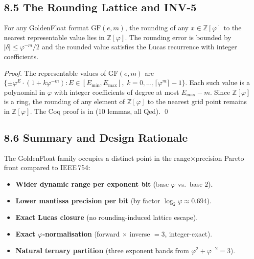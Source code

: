 \subsection{8.5 The Rounding Lattice and INV-5}\label{fa_04:gf-inv5}

\begin{theorem}
\label{fa_04:thm:inv5}
For any GoldenFloat format \(\mathrm{GF}(e,m)\), the rounding of any
\(x \in \mathbb{Z}[\varphi]\) to the nearest representable value lies in
\(\mathbb{Z}[\varphi]\). The rounding error is bounded by
\(|\delta| \le \varphi^{-m}/2\) and the rounded value satisfies the
Lucas recurrence with integer coefficients.
\end{theorem}

\begin{proof}
The representable values of \(\mathrm{GF}(e,m)\) are
\(\{ \pm \varphi^{E} \cdot (1 + k\varphi^{-m}) : E \in [E_{\min}, E_{\max}],
\; k = 0, \ldots, \lceil\varphi^m\rceil - 1 \}\).
Each such value is a polynomial in \(\varphi\) with integer coefficients
of degree at most \(E_{\max} - m\). Since \(\mathbb{Z}[\varphi]\) is a
ring, the rounding of any element of \(\mathbb{Z}[\varphi]\) to the
nearest grid point remains in \(\mathbb{Z}[\varphi]\).
The Coq proof is in
(10 lemmas, all Qed).
\qed
\end{proof}

\subsection{8.6 Summary and Design Rationale}\label{fa_04:gf-summary}

The GoldenFloat family occupies a distinct point in the
range\(\times\)precision Pareto front compared to IEEE\,754:

\begin{itemize}
  \item \textbf{Wider dynamic range per exponent bit} (base \(\varphi\) vs.\
        base \(2\)).
  \item \textbf{Lower mantissa precision per bit} (by factor
        \(\log_2\varphi \approx 0.694\)).
  \item \textbf{Exact Lucas closure} (no rounding-induced lattice escape).
  \item \textbf{Exact \(\varphi\)-normalisation} (forward \(\times\) inverse
        \(= 3\), integer-exact).
  \item \textbf{Natural ternary partition} (three exponent bands from
        \(\varphi^2 + \varphi^{-2} = 3\)).
\end{itemize}

